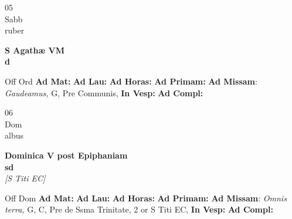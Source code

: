 \documentclass[10pt, openany]{book}
\begin{document}
        \begin{center}
            \begin{minipage}{3.5in}
                \vspace{2em}
                \begin{minipage}{0.5in}
                    {\Huge 05} \\
                    {\normalsize Sabb} \\
                    {\normalsize ruber}
                \end{minipage}
                \begin{minipage}{3.0in}
                    \textbf{ \large S Agathæ VM \\
                    \textnormal{\normalsize d}} \\ 
                \end{minipage}
                \begin{justify}Off Ord
                    \textbf{Ad Mat: }
                    \textbf{Ad Lau: }
                    \textbf{Ad Horas: }
                    \textbf{Ad Primam: }\textbf{Ad Missam}: \textit{Gaudeamus,} G, Pre Communis,  
                    \textbf{In Vesp: }
                    \textbf{Ad Compl: }
                \end{justify}
            \end{minipage}
        \end{center}
    
        \begin{center}
            \begin{minipage}{3.5in}
                \vspace{2em}
                \begin{minipage}{0.5in}
                    {\Huge 06} \\
                    {\normalsize Dom} \\
                    {\normalsize albus}
                \end{minipage}
                \begin{minipage}{3.0in}
                    \textbf{ \large Dominica V post Epiphaniam \\
                    \textnormal{\normalsize sd}} \\ \textit{[S Titi EC]} \\ 
                \end{minipage}
                \begin{justify}Off Dom
                    \textbf{Ad Mat: }
                    \textbf{Ad Lau: }
                    \textbf{Ad Horas: }
                    \textbf{Ad Primam: }\textbf{Ad Missam}: \textit{Omnis terra,} G, C, Pre de Ssma Trinitate, 2 or S Titi EC,  
                    \textbf{In Vesp: }
                    \textbf{Ad Compl: }
                \end{justify}
            \end{minipage}
        \end{center}
    
\end{document}
